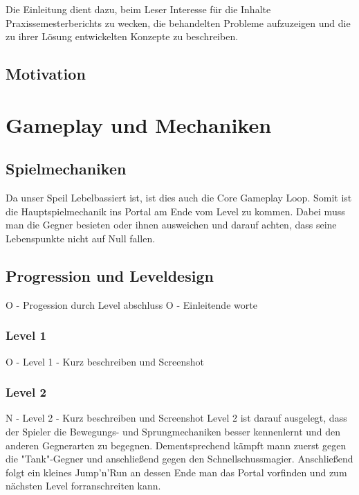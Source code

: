 \documentclass[oneside]{ausarbeitung}
\begin{document}
Die Einleitung dient dazu, beim Leser Interesse für die Inhalte 
Praxissemesterberichts zu wecken, die behandelten Probleme aufzuzeigen 
und die zu ihrer Lösung entwickelten Konzepte zu beschreiben.

\section{Motivation}
\label{sec:motivation}

\chapter{Gameplay und Mechaniken}

\section{Spielmechaniken}

Da unser Speil Lebelbassiert ist, ist dies auch die Core Gameplay Loop. Somit ist die Hauptspielmechanik ins Portal am Ende vom Level zu kommen.
Dabei muss man die Gegner besieten oder ihnen ausweichen und darauf achten, dass seine Lebenspunkte nicht auf Null fallen. 


\section{Progression und Leveldesign}

O   - Progession durch Level abschluss
O   - Einleitende worte

\subsection{Level 1}

O  - Level 1
   - Kurz beschreiben und Screenshot


\subsection{Level 2}

N  - Level 2
   - Kurz beschreiben und Screenshot
Level 2 ist darauf ausgelegt, dass der Spieler die Bewegungs- und Sprungmechaniken besser kennenlernt und den anderen Gegnerarten zu begegnen. 
Dementsprechend kämpft mann zuerst gegen die "Tank"-Gegner und anschließend gegen den Schnellschussmagier. 
Anschließend folgt ein kleines Jump'n'Run an dessen Ende man das Portal vorfinden und zum nächsten Level forranschreiten kann.
\end{document}
